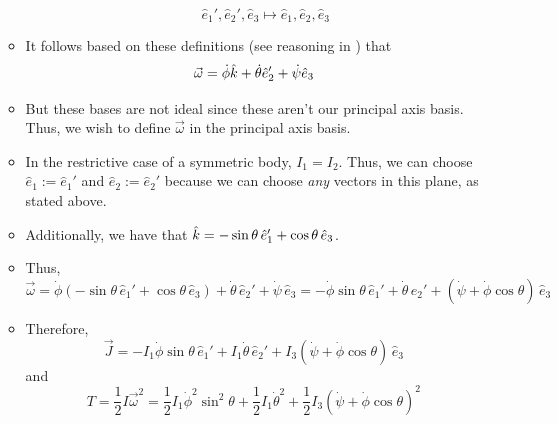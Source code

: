 \documentclass[../notes.tex]{subfiles}
\begin{document}
\begin{itemize}
\begin{itemize}
\begin{enumerate}
            \begin{equation*}
                \hat{e}_1',\hat{e}_2',\hat{e}_3 \mapsto \hat{e}_1,\hat{e}_2,\hat{e}_3
            \end{equation*}
        \end{enumerate}
        \item It follows based on these definitions (see reasoning in \textcite{bib:KibbleBerkshire}) that
        \begin{equation*}
            \vec{\omega} = \dot{\phi}\hat{k}+\dot{\theta}\hat{e}_2'+\dot{\psi}\hat{e}_3
        \end{equation*}
        \item But these bases are not ideal since these aren't our principal axis basis. Thus, we wish to define $\vec{\omega}$ in the principal axis basis.
        \item In the restrictive case of a symmetric body, $I_1=I_2$. Thus, we can choose $\hat{e}_1:=\hat{e}_1'$ and $\hat{e}_2:=\hat{e}_2'$ because we can choose \emph{any} vectors in this plane, as stated above.
        \item Additionally, we have that $\hat{k}=-\sin\theta\,\hat{e}_1'+\cos\theta\,\hat{e}_3$.
        \item Thus,
        \begin{equation*}
            \vec{\omega} = \dot{\phi}(-\sin\theta\,\hat{e}_1'+\cos\theta\,\hat{e}_3)+\dot{\theta}\,\hat{e}_2'+\dot{\psi}\,\hat{e}_3
            = -\dot{\phi}\sin\theta\,\hat{e}_1'+\dot{\theta}\,\hat{e}_2'+(\dot{\psi}+\dot{\phi}\cos\theta)\,\hat{e}_3
        \end{equation*}
        \item Therefore,
        \begin{equation*}
            \vec{J} = -I_1\dot{\phi}\sin\theta\,\hat{e}_1'+I_1\dot{\theta}\,\hat{e}_2'+I_3(\dot{\psi}+\dot{\phi}\cos\theta)\,\hat{e}_3
        \end{equation*}
        and
        \begin{equation*}
            T = \frac{1}{2}I\vec{\omega}^2
            = \frac{1}{2}I_1\dot{\phi}^2\sin^2\theta+\frac{1}{2}I_1\dot{\theta}^2+\frac{1}{2}I_3(\dot{\psi}+\dot{\phi}\cos\theta)^2
        \end{equation*}
    \end{itemize}
\end{itemize}
\end{document}
